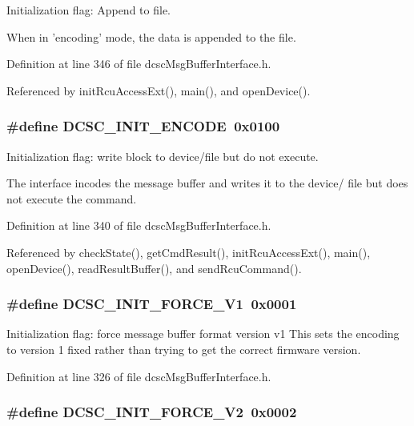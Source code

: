 Initialization flag: Append to file. 

When in 'encoding' mode, the data is appended to the file. 

Definition at line 346 of file dcsc\-Msg\-Buffer\-Interface.h.

Referenced by init\-Rcu\-Access\-Ext(), main(), and open\-Device().\hypertarget{group__dcsc__msg__buffer__access_g1283f28b3ca2f03f4cfef9a0f8a8ce40}{
\subsubsection[DCSC\_\-INIT\_\-ENCODE]{\setlength{\rightskip}{0pt plus 5cm}\#define DCSC\_\-INIT\_\-ENCODE~0x0100}}
\label{group__dcsc__msg__buffer__access_g1283f28b3ca2f03f4cfef9a0f8a8ce40}


Initialization flag: write block to device/file but do not execute. 

The interface incodes the message buffer and writes it to the device/ file but does not execute the command. 

Definition at line 340 of file dcsc\-Msg\-Buffer\-Interface.h.

Referenced by check\-State(), get\-Cmd\-Result(), init\-Rcu\-Access\-Ext(), main(), open\-Device(), read\-Result\-Buffer(), and send\-Rcu\-Command().\hypertarget{group__dcsc__msg__buffer__access_gce40b0def5fb1f60ecebe3d5c07dceb5}{
\subsubsection[DCSC\_\-INIT\_\-FORCE\_\-V1]{\setlength{\rightskip}{0pt plus 5cm}\#define DCSC\_\-INIT\_\-FORCE\_\-V1~0x0001}}
\label{group__dcsc__msg__buffer__access_gce40b0def5fb1f60ecebe3d5c07dceb5}


Initialization flag: force message buffer format version v1 This sets the encoding to version 1 fixed rather than trying to get the correct firmware version. 



Definition at line 326 of file dcsc\-Msg\-Buffer\-Interface.h.\hypertarget{group__dcsc__msg__buffer__access_g24923a207203a43bfd322e7116edf028}{
\subsubsection[DCSC\_\-INIT\_\-FORCE\_\-V2]{\setlength{\rightskip}{0pt plus 5cm}\#define DCSC\_\-INIT\_\-FORCE\_\-V2~0x0002}}
\label{group__dcsc__msg__buffer__access_g24923a207203a43bfd322e7116edf028}


